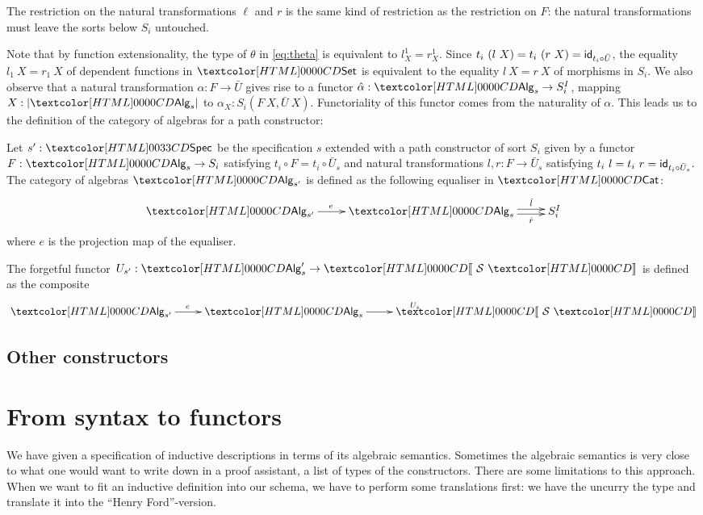 The restriction on the natural transformations $\ell$ and $r$ is the
same kind of restriction as the restriction on $F$: the natural
transformations must leave the sorts below $S_i$ untouched.

Note that by function extensionality, the type of $\theta$ in
\eqref{eq:theta} is equivalent to $l^1_X = r^1_X$. Since
$t_i\ (l\ X) = t_i\ (r\ X) = \mathsf{id}_{t_i \circ
  \bar{U}}$, %
the equality $l_1\ X = r_1\ X$ of dependent functions in
$\Set$ is equivalent to the equality $l\ X = r\ X
$ of morphisms in
$S_i$. We also observe that a natural transformation $\alpha : F \to
\bar{U}$ gives rise to a functor $\hat{\alpha} : \Alg_s \to
S_i^I$, mapping $X : | \Alg_s |$ to $\alpha_X : S_i(F\ X,\bar{U}\
X)$. Functoriality of this functor comes from the naturality of
$\alpha$. This leads us to the definition of the category of algebras
for a path constructor:

\begin{definition}
  Let $s' : \specty$ be the specification
  $s$ extended with a path constructor of sort
  $S_i$ given by a functor $F : \Alg_s \to S_i$ satisfying $t_i \circ
  F = t_i \circ \bar{U}_s$ and natural transformations $l, r : F \to
  \bar{U}_s$ satisfying $t_i\ l = t_i\ r = \mathsf{id}_{t_i \circ
    \bar{U}_s}$. The category of algebras
  $\Alg_{s'}$ is defined as the following equaliser in $\Cat$:
  \[
  \xymatrix{
    \Alg_{s'} \ar[r]^{e} &\Alg_s \ar@<-.5ex>[r]_-{\hat{r}} \ar@<.5ex>[r]^-{\hat{l}} &S_i^I
  }
  \]
  where $e$ is the projection map of the equaliser.

The forgetful functor $U_{s'} : \Alg_s' \to \SortCat{\Ss}$ is defined as the composite
\[
\xymatrix{
    \Alg_{s'} \ar[r]^{e} &\Alg_s \ar[r]^{U_s} &\SortCat{\Ss}
}
\]
\end{definition}

\subsection{Other constructors}



\section{From syntax to functors}

We have given a specification of inductive descriptions in terms of
its algebraic semantics. Sometimes the algebraic semantics is very
close to what one would want to write down in a proof assistant, \ie a
list of types of the constructors. There are some limitations to this
approach. When we want to fit an inductive definition into our schema,
we have to perform some translations first: we have the uncurry the
type and translate it into the ``Henry Ford''-version.

